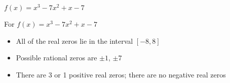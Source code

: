 {$f(x) = x^{3} - 7x^{2} + x - 7$}
{For   $f(x) = x^{3} - 7x^{2} + x - 7$
\begin{itemize}
\item  All of the real zeros lie in the interval $[-8,8]$
\item  Possible rational zeros are $\pm 1$, $\pm 7$
\item  There are 3 or 1 positive real zeros;  there are no negative real zeros
\end{itemize}
}